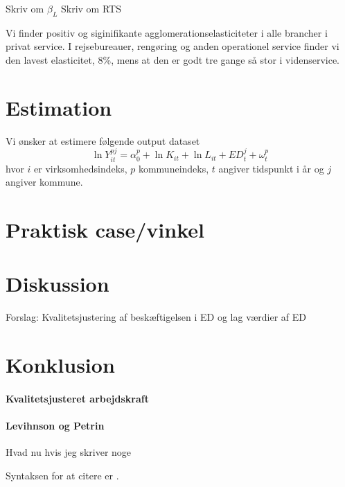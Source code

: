 \documentclass[a4paper, 12pt, titlepage]{article}
\begin{document}
Skriv om $\beta_L$
Skriv om RTS


Vi finder positiv og siginifikante agglomerationselasticiteter i alle brancher i privat service. I rejsebureauer, rengøring og anden operationel service finder vi den lavest elasticitet, 8\%, mens at den er godt tre gange så stor i videnservice. 








\section{Estimation}
Vi ønsker at estimere følgende output dataset
\begin{equation}
	\ln Y_{it}^{pj} = \alpha^p_0 + \ln K_{it} + \ln L_{it} + ED^j_{t} + \omega^p_{t}
\end{equation}
hvor $i$ er virksomhedsindeks, $p$ kommuneindeks, $t$ angiver tidspunkt i år og $j$ angiver kommune. 

\section{Praktisk case/vinkel}
\section{Diskussion}
Forslag: Kvalitetsjustering af beskæftigelsen i ED og lag værdier af ED 
\section{Konklusion}



\paragraph{Kvalitetsjusteret arbejdskraft}



\paragraph{Levihnson og Petrin}
Hvad nu hvis jeg skriver noge

Syntaksen for at citere er \cite[pp. 211ff.]{melo2009meta}. 






\end{document}
